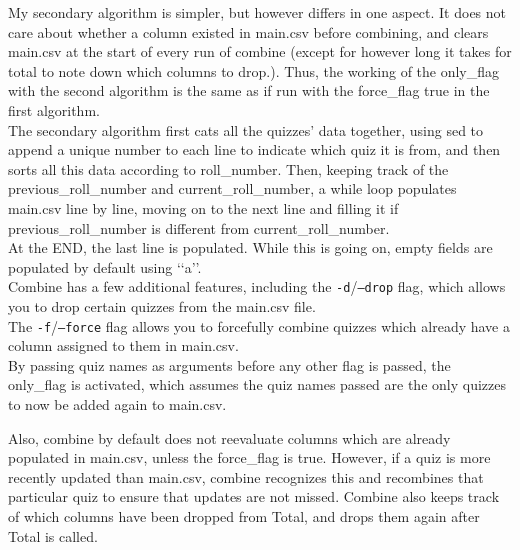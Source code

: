 \documentclass{article}
\begin{document}
    My secondary algorithm is simpler, but however differs in one aspect. It does not care about whether a column existed in main.csv before combining, and clears main.csv at the start of every run of combine (except for however long it takes for total to note down which columns to drop.). Thus, the working of the only\_flag with the second algorithm is the same as if run with the force\_flag true in the first algorithm.\\
    The secondary algorithm first cats all the quizzes' data together, using sed to append a unique number to each line to indicate which quiz it is from, and then sorts all this data according to roll\_number. Then, keeping track of the previous\_roll\_number and current\_roll\_number, a while loop populates main.csv line by line, moving on to the next line and filling it if previous\_roll\_number is different from current\_roll\_number.\\
    At the END, the last line is populated. While this is going on, empty fields are populated by default using \lq\lq a\rq\rq.\\
    
    Combine has a few additional features, including the \texttt{-d}/\texttt{--drop} flag, which allows you to drop certain quizzes from the main.csv file.\\
    The \texttt{-f}/\texttt{--force} flag allows you to forcefully combine quizzes which already have a column assigned to them in main.csv.\\
    By passing quiz names as arguments before any other flag is passed, the only\_flag is activated, which assumes the quiz names passed are the only quizzes to now be added again to main.csv.

    Also, combine by default does not reevaluate columns which are already populated in main.csv, unless the force\_flag is true. However, if a quiz is more recently updated than main.csv, combine recognizes this and recombines that particular quiz to ensure that updates are not missed.
    Combine also keeps track of which columns have been dropped from Total, and drops them again after Total is called.
\end{document}

